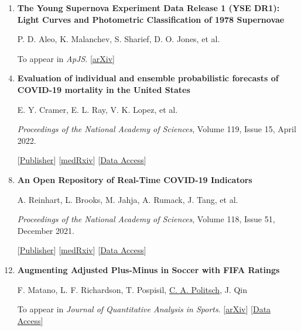 \documentclass[letterpaper,10pt]{article}
\begin{document}
\begin{enumerate}[leftmargin=0.6cm, itemsep=-0.05cm]
\vspace{0.5cm}

\item {\bf The Young Supernova Experiment Data Release 1 (YSE DR1): Light Curves and Photometric Classification of 1978 Supernovae}
\item[] P. D. Aleo, K. Malanchev, S. Sharief, D. O. Jones, et al.
\item[] To appear in {\it ApJS}. [\href{https://arxiv.org/abs/2211.07128}{arXiv}]

\vspace{0.5cm}

\item {\bf Evaluation of individual and ensemble probabilistic forecasts of COVID-19 mortality in the United States} 
\item[] E. Y. Cramer, E. L. Ray, V. K. Lopez, et al.
\item[] {\it Proceedings of the National Academy of Sciences}, Volume 119, Issue 15, April 2022.
\item[] [\href{https://www.pnas.org/doi/10.1073/pnas.2113561119}{Publisher}] [\href{https://www.medrxiv.org/content/10.1101/2021.02.03.21250974v3}{medRxiv}] [\href{https://covid19forecasthub.org/}{Data Access}]

\vspace{0.5cm}

\item {\bf An Open Repository of Real-Time COVID-19 Indicators} 
\item[] A. Reinhart, L. Brooks, M. Jahja, A. Rumack, J. Tang, et al.
\item[] {\it Proceedings of the National Academy of Sciences}, Volume 118, Issue 51, December 2021.
\item[] [\href{https://doi.org/10.1073/pnas.2111452118}{Publisher}]
[\href{https://www.medrxiv.org/content/10.1101/2021.07.12.21259660v2}{medRxiv}]
[\href{https://cmu-delphi.github.io/delphi-epidata/api/covidcast.html}{Data Access}]

\vspace{0.5cm}


\item {\bf Augmenting Adjusted Plus-Minus in Soccer with FIFA Ratings}
\item[] F. Matano, L. F. Richardson, T. Pospisil, \underline{C. A. Politsch}, J. Qin
\item[] {To appear in {\it Journal of Quantitative Analysis in Sports}. [\href{https://arxiv.org/abs/1810.08032}{arXiv}] [\href{http://intraocular.net/}{Data Access}}]
\end{enumerate}
\end{document}
